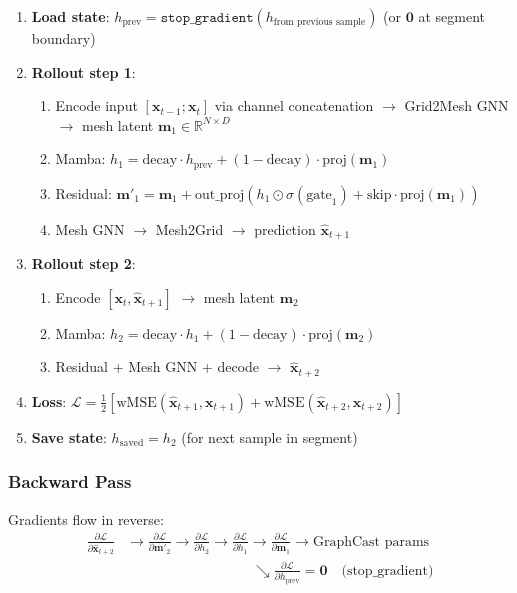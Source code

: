 \documentclass[11pt,a4paper]{article}
\begin{document}
\begin{enumerate}
  \item \textbf{Load state}: $h_\text{prev} = \texttt{stop\_gradient}(h_\text{from previous sample})$ \quad (or $\mathbf{0}$ at segment boundary)
  \item \textbf{Rollout step 1}:
  \begin{enumerate}[nosep]
    \item Encode input $[\mathbf{x}_{t-1}; \mathbf{x}_t]$ via channel concatenation $\to$ Grid2Mesh GNN $\to$ mesh latent $\mathbf{m}_1 \in \mathbb{R}^{N \times D}$
    \item Mamba: $h_1 = \text{decay} \cdot h_\text{prev} + (1-\text{decay}) \cdot \text{proj}(\mathbf{m}_1)$
    \item Residual: $\mathbf{m}'_1 = \mathbf{m}_1 + \text{out\_proj}(h_1 \odot \sigma(\text{gate}_1) + \text{skip} \cdot \text{proj}(\mathbf{m}_1))$
    \item Mesh GNN $\to$ Mesh2Grid $\to$ prediction $\hat{\mathbf{x}}_{t+1}$
  \end{enumerate}
  \item \textbf{Rollout step 2}:
  \begin{enumerate}[nosep]
    \item Encode $[\mathbf{x}_t, \hat{\mathbf{x}}_{t+1}]$ $\to$ mesh latent $\mathbf{m}_2$
    \item Mamba: $h_2 = \text{decay} \cdot h_1 + (1-\text{decay}) \cdot \text{proj}(\mathbf{m}_2)$
    \item Residual + Mesh GNN + decode $\to$ $\hat{\mathbf{x}}_{t+2}$
  \end{enumerate}
  \item \textbf{Loss}: $\mathcal{L} = \frac{1}{2}\left[\text{wMSE}(\hat{\mathbf{x}}_{t+1}, \mathbf{x}_{t+1}) + \text{wMSE}(\hat{\mathbf{x}}_{t+2}, \mathbf{x}_{t+2})\right]$
  \item \textbf{Save state}: $h_\text{saved} = h_2$ (for next sample in segment)
\end{enumerate}

\subsubsection{Backward Pass}

Gradients flow in reverse:
\begin{align*}
\frac{\partial \mathcal{L}}{\partial \hat{\mathbf{x}}_{t+2}} &\to \frac{\partial \mathcal{L}}{\partial \mathbf{m}'_2} \to \frac{\partial \mathcal{L}}{\partial h_2} \to \frac{\partial \mathcal{L}}{\partial h_1} \to \frac{\partial \mathcal{L}}{\partial \mathbf{m}_1} \to \text{GraphCast params} \\
&\quad\quad\quad\quad\quad\quad\quad\quad\quad \searrow \frac{\partial \mathcal{L}}{\partial h_\text{prev}} = \mathbf{0} \quad \text{(stop\_gradient)}
\end{align*}
\end{document}
